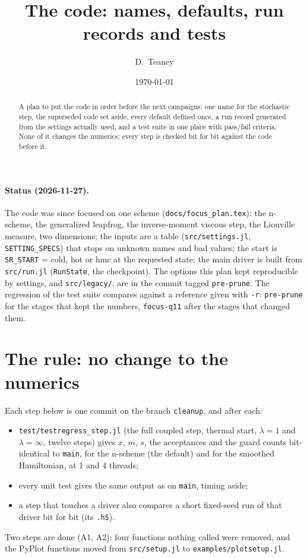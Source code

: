 \documentclass[11pt,aps,preprint,nofootinbib,superscriptaddress,tightenlines]{revtex4-2}
\newcommand{\file}[1]{\texttt{#1}}
\let\oldparagraph\paragraph
\renewcommand{\paragraph}{\par\bigskip\oldparagraph}
\begin{document}
\sloppy

\title{The code: names, defaults, run records and tests}
\author{D.~Teaney}
\date{\today}

\begin{abstract}
A plan to put the code in order before the next campaigns: one name for the stochastic step,
the superseded code set aside, every default defined once, a run record generated from the
settings actually used, and a test suite in one place with pass/fail criteria.  None of it
changes the numerics; every step is checked bit for bit against the code before it.
\end{abstract}

\maketitle

\paragraph{Status (2026-11-27).}  The code was since focused on one scheme (\file{docs/focus\_plan.tex}): the n-scheme, the
generalized leapfrog, the inverse-moment viscous step, the Liouville measure, two dimensions; the inputs are a table
(\file{src/settings.jl}, \file{SETTING\_SPECS}) that stops on unknown names and bad values; the start is \file{SR\_START} = cold, hot or
hmc at the requested state; the main driver is built from \file{src/run.jl} (\file{RunState}, the checkpoint).  The options this plan
kept reproducible by settings, and \file{src/legacy/}, are in the commit tagged \file{pre-prune}.  The regression of the test suite
compares against a reference given with \file{-r}: \file{pre-prune} for the stages that kept the numbers, \file{focus-q11} after the
stages that changed them.

\section{The rule: no change to the numerics}
\label{sec:rule}

Each step below is one commit on the branch \file{cleanup}, and after each:
\begin{itemize}
\item \file{test/testregress\_step.jl} (the full coupled step, thermal start, $\lambda=1$ and
  $\lambda=\infty$, twelve steps) gives $x$, $m$, $s$, the acceptances and the guard counts
  bit-identical to \file{main}, for the n-scheme (the default) and for the smoothed
  Hamiltonian, at 1 and 4 threads;
\item every unit test gives the same output as on \file{main}, timing aside;
\item a step that touches a driver also compares a short fixed-seed run of that driver bit for
  bit (its \file{.h5}).
\end{itemize}
Two steps are done (A1, A2): four functions nothing called were removed, and the PyPlot
functions moved from \file{src/setup.jl} to \file{examples/plotsetup.jl}.
\end{document}
